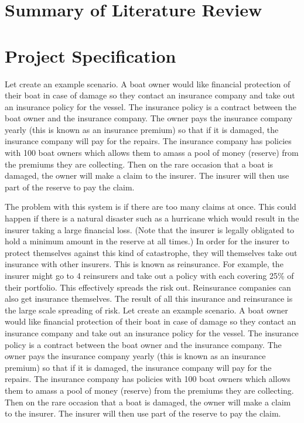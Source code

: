 \documentclass[12pt]{article}
\begin{document}
\section{Summary of Literature Review}
\section{Project Specification}
Let create an example scenario. A boat owner would like financial protection of their boat in case of damage so they contact an insurance company and take out an insurance policy for the vessel. The insurance policy is a contract between the boat owner and the insurance company. The owner pays the insurance company yearly (this is known as an insurance premium) so that if it is damaged, the insurance company will pay for the repairs. The insurance company has policies with 100 boat owners which allows them to amass a pool of money (reserve) from the premiums they are collecting. Then on the rare occasion that a boat is damaged, the owner will make a claim to the insurer. The insurer will then use part of the reserve to pay the claim.

The problem with this system is if there are too many claims at once. This could happen if there is a natural disaster such as a hurricane which would result in the insurer taking a large financial loss. (Note that the insurer is legally obligated to hold a minimum amount in the reserve at all times.) In order for the insurer to protect themselves against this kind of catastrophe, they will themselves take out insurance with other insurers. This is known as reinsurance. For example, the insurer might go to 4 reinsurers and take out a policy with each covering 25\% of their portfolio. This effectively spreads the risk out. Reinsurance companies can also get insurance themselves. The result of all this insurance and reinsurance is the large scale spreading of risk.
Let create an example scenario. A boat owner would like financial protection of their boat in case of damage so they contact an insurance company and take out an insurance policy for the vessel. The insurance policy is a contract between the boat owner and the insurance company. The owner pays the insurance company yearly (this is known as an insurance premium) so that if it is damaged, the insurance company will pay for the repairs. The insurance company has policies with 100 boat owners which allows them to amass a pool of money (reserve) from the premiums they are collecting. Then on the rare occasion that a boat is damaged, the owner will make a claim to the insurer. The insurer will then use part of the reserve to pay the claim.
\end{document}
